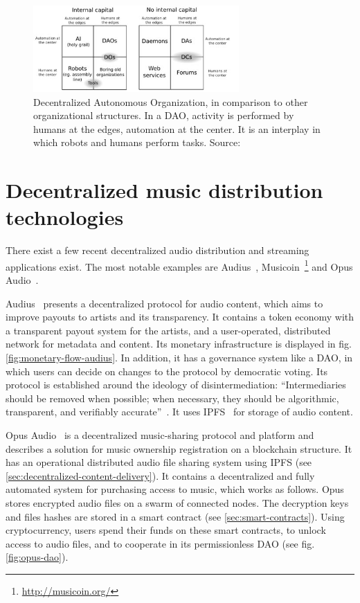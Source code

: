 
\begin{figure}
    \centering
    \includegraphics[width=0.7\textwidth]{introduction/dao-quadrants.jpg}
    \caption{Decentralized Autonomous Organization, in comparison to other organizational structures. In a DAO, activity is performed by humans at the edges, automation at the center. It is an interplay in which robots and humans perform tasks. Source: \cite{buterin2014dao}}
    \label{fig:dao-quadrants}
\end{figure}

\section{Decentralized music distribution technologies}
\label{sec:related-work}
There exist a few recent decentralized audio distribution and streaming applications exist. The most notable examples are Audius~\citep{audius2018}, Musicoin~\footnote{\url{http://musicoin.org/}} and Opus Audio~\citep{jia2016opus}.

Audius~\citep{audius2018} presents a decentralized protocol for audio content, which aims to improve payouts to artists and its transparency. It contains a token economy with a transparent payout system for the artists, and a user-operated, distributed network for metadata and content. Its monetary infrastructure is displayed in fig. \ref{fig:monetary-flow-audius}. In addition, it has a governance system like a DAO, in which users can decide on changes to the protocol by democratic voting. Its protocol is established around the ideology of disintermediation: ``Intermediaries  should be removed  when possible; when necessary, they should be algorithmic, transparent, and verifiably accurate''~\citep{audius2018}. It uses IPFS~\citep{benet2014ipfs} for storage of audio content.

Opus Audio~\citep{jia2016opus} is a decentralized music-sharing protocol and platform and describes a solution for music ownership registration on a blockchain structure. It has an operational distributed audio file sharing system using IPFS \cite{benet2014ipfs} (see \ref{sec:decentralized-content-delivery}). It contains a decentralized and fully automated system for purchasing access to music, which works as follows. Opus stores encrypted audio files on a swarm of connected nodes. The decryption keys and files hashes are stored in a smart contract (see \ref{sec:smart-contracts}). Using cryptocurrency, users spend their funds on these smart contracts, to unlock access to audio files, and to cooperate in its permissionless DAO (see fig. \ref{fig:opus-dao}).


